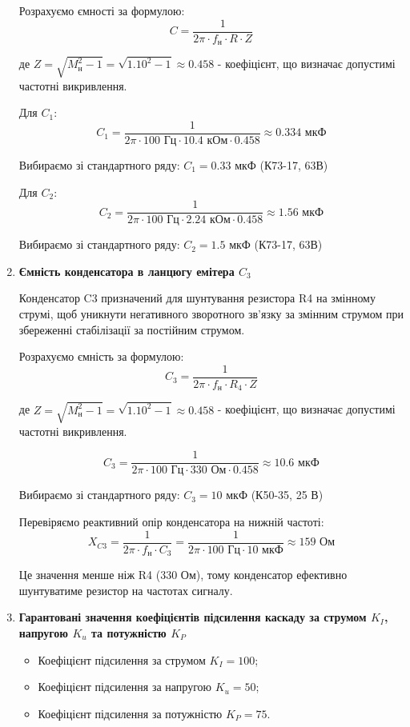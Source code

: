 \documentclass[main.tex]{subfiles}
\begin{document}
\begin{enumerate}
Розрахуємо ємності за формулою:
\[C = \frac{1}{2\pi \cdot f_{\text{н}} \cdot R \cdot Z}\]

де $Z = \sqrt{M_{\text{н}}^2 - 1} = \sqrt{1.10^2 - 1} \approx 0.458$ - коефіцієнт, що визначає допустимі частотні викривлення.

Для $C_1$:
\[C_1 = \frac{1}{2\pi \cdot 100\text{ Гц} \cdot 10.4\text{ кОм} \cdot 0.458} \approx 0.334\text{ мкФ}\]

Вибираємо зі стандартного ряду: $C_1 = 0.33\text{ мкФ}$ (К73-17, 63В)

Для $C_2$:
\[C_2 = \frac{1}{2\pi \cdot 100\text{ Гц} \cdot 2.24\text{ кОм} \cdot 0.458} \approx 1.56\text{ мкФ}\]

Вибираємо зі стандартного ряду: $C_2 = 1.5\text{ мкФ}$ (К73-17, 63В)

\item \textbf{Ємність конденсатора в ланцюгу емітера $C_3$} \newline

Конденсатор C3 призначений для шунтування резистора R4 на змінному струмі, щоб уникнути негативного зворотного зв'язку за змінним струмом при збереженні стабілізації за постійним струмом.

Розрахуємо ємність за формулою:
\[C_3 = \frac{1}{2\pi \cdot f_{\text{н}} \cdot R_4 \cdot Z}\]

де $Z = \sqrt{M_{\text{н}}^2 - 1} = \sqrt{1.10^2 - 1} \approx 0.458$ - коефіцієнт, що визначає допустимі частотні викривлення.

\[C_3 = \frac{1}{2\pi \cdot 100\text{ Гц} \cdot 330\text{ Ом} \cdot 0.458} \approx 10.6\text{ мкФ}\]

Вибираємо зі стандартного ряду: $C_3 = 10\text{ мкФ}$ (К50-35, 25 В)

Перевіряємо реактивний опір конденсатора на нижній частоті:
\[X_{C3} = \frac{1}{2\pi \cdot f_{\text{н}} \cdot C_3} = \frac{1}{2\pi \cdot 100\text{ Гц} \cdot 10\text{ мкФ}} \approx 159\text{ Ом}\]

Це значення менше ніж R4 (330 Ом), тому конденсатор ефективно шунтуватиме резистор на частотах сигналу.

\item \textbf{Гарантовані значення коефіцієнтів підсилення каскаду за струмом $K_I$, напругою $K_u$ та потужністю $K_P$} \newline

\begin{itemize}
    \item Коефіцієнт підсилення за струмом $K_I = 100$;
    \item Коефіцієнт підсилення за напругою $K_u = 50$;
    \item Коефіцієнт підсилення за потужністю $K_P = 75$.
\end{itemize}



\end{enumerate}
\end{document}
